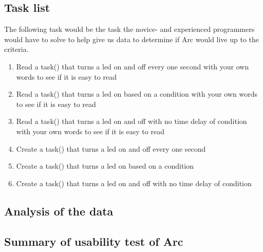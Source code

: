 \subsection{Task list}\label{subsubsec:taskList}
The following task would be the task the novice- and experienced programmers would have to solve to help give us data to determine if Arc would live up to the criteria.
\begin{enumerate} %
    \item Read a task() that turns a led on and off every one second with your own words to see if it is easy to read
    \item Read a task() that turns a led on based on a condition with your own words to see if it is easy to read
    \item Read a task() that turns a led on and off with no time delay of condition with your own words to see if it is easy to read
    \item Create a task() that turns a led on and off every one second
    \item Create a task() that turns a led on based on a condition
    \item Create a task() that turns a led on and off with no time delay of condition
\end{enumerate}

\subsection{Analysis of the data}\label{subsubsec:analysisOfTheData}


\subsection{Summary of usability test of Arc}



